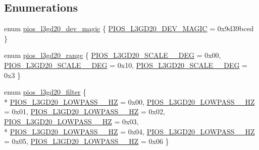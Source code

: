 \subsection*{Enumerations}
\begin{DoxyCompactItemize}
\item 
enum \hyperlink{group___p_i_o_s___l3_g_d20_ga34e70adc9970e3e83c4d39e720087df3}{pios\-\_\-l3gd20\-\_\-dev\-\_\-magic} \{ \hyperlink{group___p_i_o_s___l3_g_d20_gga34e70adc9970e3e83c4d39e720087df3a8ff24655b5a2966b5bdf02704790f7c1}{P\-I\-O\-S\-\_\-\-L3\-G\-D20\-\_\-\-D\-E\-V\-\_\-\-M\-A\-G\-I\-C} = 0x9d39bced
 \}
\item 
enum \hyperlink{group___p_i_o_s___l3_g_d20_ga704696d385abb591516d2e31301dad66}{pios\-\_\-l3gd20\-\_\-range} \{ \hyperlink{group___p_i_o_s___l3_g_d20_gga704696d385abb591516d2e31301dad66aedd6eafcd26b7ea732535c95e6df130b}{P\-I\-O\-S\-\_\-\-L3\-G\-D20\-\_\-\-S\-C\-A\-L\-E\-\_\-\_\-\-D\-E\-G} = 0x00, 
\hyperlink{group___p_i_o_s___l3_g_d20_gga704696d385abb591516d2e31301dad66a7e5b9b2cf555ad09aa1dd0ba78acb274}{P\-I\-O\-S\-\_\-\-L3\-G\-D20\-\_\-\-S\-C\-A\-L\-E\-\_\-\_\-\-D\-E\-G} = 0x10, 
\hyperlink{group___p_i_o_s___l3_g_d20_gga704696d385abb591516d2e31301dad66a3c6ef417567852dc017c6d0158a15eba}{P\-I\-O\-S\-\_\-\-L3\-G\-D20\-\_\-\-S\-C\-A\-L\-E\-\_\-\_\-\-D\-E\-G} = 0x3
 \}
\item 
enum \hyperlink{group___p_i_o_s___l3_g_d20_ga61c11c9fa344e4d6a9087dd81414d54c}{pios\-\_\-l3gd20\-\_\-filter} \{ \\*
\hyperlink{group___p_i_o_s___l3_g_d20_gga61c11c9fa344e4d6a9087dd81414d54ca7bcc15cafe9ca8cc2ffe55a8920d9b0d}{P\-I\-O\-S\-\_\-\-L3\-G\-D20\-\_\-\-L\-O\-W\-P\-A\-S\-S\-\_\-\_\-\-H\-Z} = 0x00, 
\hyperlink{group___p_i_o_s___l3_g_d20_gga61c11c9fa344e4d6a9087dd81414d54cac31670f3cab1a3a10fead7d61959cee9}{P\-I\-O\-S\-\_\-\-L3\-G\-D20\-\_\-\-L\-O\-W\-P\-A\-S\-S\-\_\-\_\-\-H\-Z} = 0x01, 
\hyperlink{group___p_i_o_s___l3_g_d20_gga61c11c9fa344e4d6a9087dd81414d54ca6d73399d5d2252dc4e577812335b48f4}{P\-I\-O\-S\-\_\-\-L3\-G\-D20\-\_\-\-L\-O\-W\-P\-A\-S\-S\-\_\-\_\-\-H\-Z} = 0x02, 
\hyperlink{group___p_i_o_s___l3_g_d20_gga61c11c9fa344e4d6a9087dd81414d54cad7a50f4cfb1e0155140f7f0e5113e50e}{P\-I\-O\-S\-\_\-\-L3\-G\-D20\-\_\-\-L\-O\-W\-P\-A\-S\-S\-\_\-\_\-\-H\-Z} = 0x03, 
\\*
\hyperlink{group___p_i_o_s___l3_g_d20_gga61c11c9fa344e4d6a9087dd81414d54ca73a26a6c815fe14b8658e2e20364cbbe}{P\-I\-O\-S\-\_\-\-L3\-G\-D20\-\_\-\-L\-O\-W\-P\-A\-S\-S\-\_\-\_\-\-H\-Z} = 0x04, 
\hyperlink{group___p_i_o_s___l3_g_d20_gga61c11c9fa344e4d6a9087dd81414d54ca96ce608de595fe92992a8a80117aae23}{P\-I\-O\-S\-\_\-\-L3\-G\-D20\-\_\-\-L\-O\-W\-P\-A\-S\-S\-\_\-\_\-\-H\-Z} = 0x05, 
\hyperlink{group___p_i_o_s___l3_g_d20_gga61c11c9fa344e4d6a9087dd81414d54ca4aafab965ecb9a13cbd74263c0609526}{P\-I\-O\-S\-\_\-\-L3\-G\-D20\-\_\-\-L\-O\-W\-P\-A\-S\-S\-\_\-\_\-\-H\-Z} = 0x06
 \}
\end{DoxyCompactItemize}
